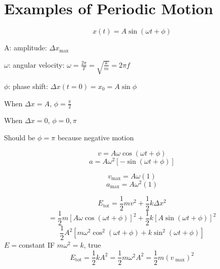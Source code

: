 \documentclass[fleqn]{article}
\begin{document}
\setlength{\mathindent}{0pt}
\section*{Examples of Periodic Motion}
\[ \boxed {x(t) = A \sin \left( \omega t + \phi \right) } \]

A: amplitude: $\Delta x _{\text{max} } $

$\omega$: angular velocity: $\omega = \frac{2 \pi}{T} = \sqrt{\frac{k}{m} } = 2 \pi f$

$\phi$: phase shift: $\Delta x(t=0) = x_0 = A \sin \phi$

When $\Delta x=A$, $\phi = \frac{\pi}{2} $

When $\Delta x=0$, $\phi = 0, \pi$

Should be $\phi = \pi$ because negative motion

\[ v=A \omega \cos \left( \omega t + \phi \right) \]
\[ a = A \omega ^2 \left[ - \sin \left( \omega t + \phi \right) \right] \]

\[ v _{\text{max} } = A \omega (1) \]
\[ a _{\text{max} } = A \omega ^2 (1) \]

\[ E _{\text{tot} } = \frac{1}{2} mv^2 + \frac{1}{2} k \Delta x ^2 \]
\[ = \frac{1}{2} m \left[ A \omega \cos \left( \omega t + \phi \right) \right]^2 + \frac{1}{2} k \left[ A \sin \left( \omega t + \phi \right) \right]^2 \]
\[ \frac{1}{2} A^2 \left[ m \omega ^2 \cos ^2 \left( \omega t + \phi \right) + k \sin ^2 \left( \omega t + \phi \right) \right] \]
$E=$constant IF $m \omega ^2=k$, true
\[ \boxed{E _{\text{tot} }= \frac{1}{2} kA^2 = \frac{1}{2} m \omega ^2 A^2 = \frac{1}{2} m \left( v _{\text{ max} }  \right)^2} \]
\end{document}
